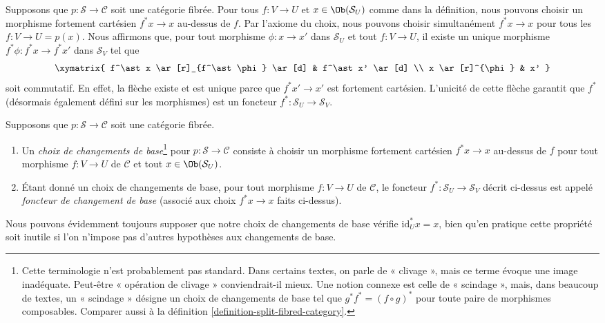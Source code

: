 \noindent
Supposons que $p : \mathcal{S} \to \mathcal{C}$ soit une catégorie fibrée.
Pour tous $f : V \to U$ et $x\in \Ob(\mathcal{S}_U)$ comme dans la
définition, nous pouvons choisir un morphisme fortement cartésien
$f^\ast x \to x$ au-dessus de $f$. Par l'axiome du choix, nous pouvons
choisir simultanément $f^*x \to x$ pour tous les
$f: V \to U = p(x)$. Nous affirmons que, pour tout morphisme
$\phi : x \to x'$ dans $\mathcal{S}_U$ et tout $f : V \to U$, il existe
un unique morphisme $f^\ast \phi : f^\ast x \to f^\ast x'$ dans
$\mathcal{S}_V$ tel que
$$
\xymatrix{
f^\ast x \ar[r]_{f^\ast \phi} \ar[d] & f^\ast x' \ar[d] \\
x \ar[r]^{\phi} & x' }
$$
soit commutatif. En effet, la flèche existe et est unique parce que
$f^*x' \to x'$ est fortement cartésien. L'unicité de cette flèche garantit
que $f^\ast$ (désormais également défini sur les morphismes) est un
foncteur $ f^\ast : \mathcal{S}_U \to \mathcal{S}_V$.

\begin{definition}
\label{definition-pullback-functor-fibred-category}
Supposons que $p : \mathcal{S} \to \mathcal{C}$ soit une catégorie fibrée.
\begin{enumerate}
\item Un {\it choix de changements de base}\footnote{Cette terminologie
n'est probablement pas standard. Dans certains textes, on parle de
« clivage », mais ce terme évoque une image inadéquate. Peut-être
« opération de clivage » conviendrait-il mieux. Une notion connexe est
celle de « scindage », mais, dans beaucoup de textes, un « scindage »
désigne un choix de changements de base tel que
$g^*f^* = (f \circ g)^*$ pour toute paire de morphismes composables.
Comparer aussi à la définition \ref{definition-split-fibred-category}.}
pour $p : \mathcal{S} \to \mathcal{C}$
consiste à choisir un morphisme fortement cartésien
$f^\ast x \to x$ au-dessus de $f$ pour tout morphisme
$f: V \to U$ de $\mathcal{C}$ et tout $x \in \Ob(\mathcal{S}_U)$.
\item Étant donné un choix de changements de base, pour tout morphisme
$f : V \to U$ de $\mathcal{C}$, le foncteur
$f^* : \mathcal{S}_U \to \mathcal{S}_V$ décrit ci-dessus est appelé
{\it foncteur de changement de base} (associé aux choix
$f^*x \to x$ faits ci-dessus).
\end{enumerate}
\end{definition}

\noindent
Nous pouvons évidemment toujours supposer que notre choix de changements
de base vérifie $\text{id}_U^*x = x$, bien qu'en pratique cette propriété
soit inutile si l'on n'impose pas d'autres hypothèses aux changements de base.

